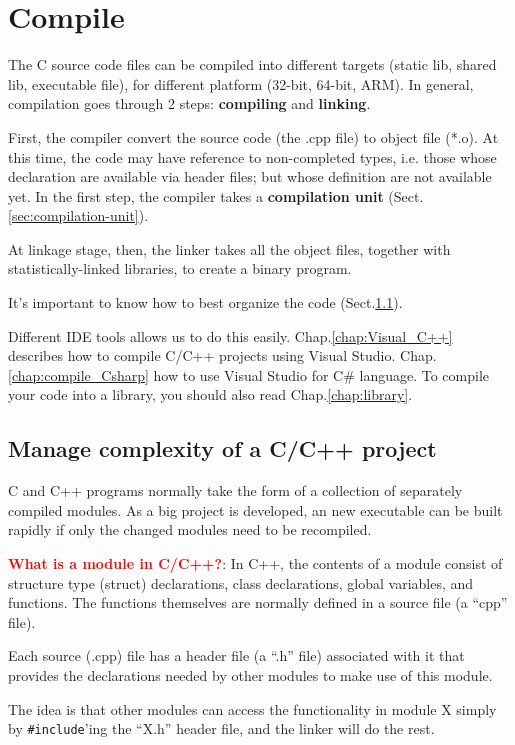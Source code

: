 \chapter{Compile}
\label{chap:compiler}


The C source code files can be compiled into different targets (static lib,
shared lib, executable file), for different platform (32-bit, 64-bit, ARM).
In general, compilation goes through 2 steps:
{\bf compiling} and {\bf linking}. 

First, the compiler convert the source code (the .cpp file) to object file
(*.o). At this time, the code may have reference to non-completed types, i.e.
those whose declaration are available via header files; but whose definition are
not available yet.
In the first step, the compiler takes a {\bf compilation unit}
(Sect.\ref{sec:compilation-unit}).

At linkage stage, then, the linker takes all the object files, together with
statistically-linked libraries, to create a binary program.

It's important to know how to best organize the code (Sect.\ref{sec:modules-in-C++}).

Different IDE tools allows us to do this easily. Chap.\ref{chap:Visual_C++}
describes how to compile C/C++ projects using Visual Studio.
Chap.\ref{chap:compile_Csharp} how to use Visual Studio for C\# language. To
compile your code into a library, you should also read Chap.\ref{chap:library}.

\section{Manage complexity of a C/C++ project}
\label{sec:modules-in-C++}

C and C++ programs normally take the form of a collection of separately compiled
modules.
As a big project is developed, an new executable can be built rapidly if only
the changed modules need to be recompiled.

\textcolor{red}{\bf What is a module in C/C++?}:
In C++, the contents of a module consist of structure type (struct)
declarations, class declarations, global variables, and functions.
The functions themselves are normally defined in a source file (a “cpp” file).

Each source (.cpp) file has a header file (a “.h” file) associated with it
that provides the declarations needed by other modules to make use of this
module.

The idea is that other modules can access the functionality in module X simply
by \verb!#include!'ing the “X.h” header file, and the linker will do the rest.

